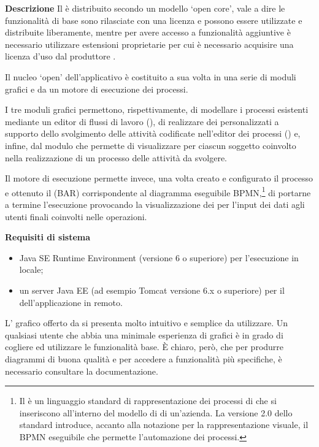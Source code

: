\textbf{Descrizione}
Il \sw è distribuito secondo un modello `open core', vale a dire le funzionalità di base sono rilasciate con una licenza  e possono essere utilizzate e distribuite liberamente, mentre per avere accesso a funzionalità aggiuntive è necessario utilizzare estensioni proprietarie per cui è necessario acquisire una licenza d'uso dal produttore .

Il nucleo `open' dell'applicativo è costituito a sua volta in una serie di moduli grafici e da un motore di esecuzione dei processi.

I tre moduli grafici permettono, rispettivamente, di modellare i processi esistenti mediante un editor di flussi di lavoro (), di realizzare dei  personalizzati a supporto dello svolgimento delle attività codificate nell'editor dei processi () e, infine, dal modulo  che permette di visualizzare per ciascun soggetto coinvolto nella realizzazione di un processo delle attività da svolgere.

Il motore di esecuzione permette invece, una volta creato e configurato il processo e ottenuto il  (BAR) corrispondente al diagramma eseguibile BPMN,\footnote{%
Il  è un linguaggio standard di rappresentazione dei processi di \bsn che si inseriscono all'interno del modello di \bsn di un'azienda. La versione 2.0 dello standard introduce, accanto alla notazione per la rappresentazione visuale, il BPMN eseguibile che permette l'automazione dei processi.
}
di portarne a termine l'esecuzione provocando la visualizzazione dei  per l'input dei dati agli utenti finali coinvolti nelle operazioni.

\textbf{Requisiti di sistema}
\begin{itemize}
\item Java SE Runtime Environment (versione 6 o superiore) per l'esecuzione in locale;
\item un server Java EE (ad esempio Tomcat versione 6.x o superiore) per il  dell'applicazione in remoto.
\end{itemize}



L' grafico offerto da  si presenta molto intuitivo e semplice da utilizzare. Un qualsiasi utente che abbia una minimale esperienza di  grafici è in grado di cogliere ed utilizzare le funzionalità base. È  chiaro, però, che per produrre diagrammi di buona qualità e per accedere a funzionalità più specifiche, è necessario consultare la documentazione. 

